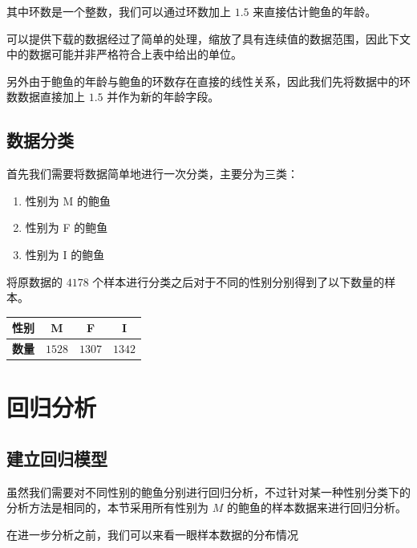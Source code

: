 \documentclass[hyperref,UTF8,12pt,a4paper]{ctexart}
\begin{document}
其中环数是一个整数，我们可以通过环数加上 $1.5$ 来直接估计鲍鱼的年龄。

可以提供下载的数据经过了简单的处理，缩放了具有连续值的数据范围，因此下文中的数据可能并非严格符合上表中给出的单位。

另外由于鲍鱼的年龄与鲍鱼的环数存在直接的线性关系，因此我们先将数据中的环数数据直接加上 $1.5$ 并作为新的年龄字段。

\subsection{数据分类}

首先我们需要将数据简单地进行一次分类，主要分为三类：

\begin{enumerate}
  \item 性别为 M 的鲍鱼
  \item 性别为 F 的鲍鱼
  \item 性别为 I 的鲍鱼
\end{enumerate}

将原数据的 $4178$ 个样本进行分类之后对于不同的性别分别得到了以下数量的样本。

\begin{center}
  \begin{tabular}{c | c c c}
    \hline
    \textbf{性别} & M & F & I \\
    \hline
    \textbf{数量} & $1528$ & $1307$ & $1342$ \\
    \hline
  \end{tabular}
\end{center}


\section{回归分析}

\subsection{建立回归模型}

虽然我们需要对不同性别的鲍鱼分别进行回归分析，不过针对某一种性别分类下的分析方法是相同的，本节采用所有性别为 $M$ 的鲍鱼的样本数据来进行回归分析。

在进一步分析之前，我们可以来看一眼样本数据的分布情况
\end{document}
